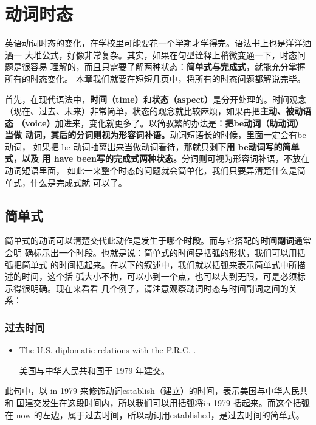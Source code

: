 \chapter{动词时态}

英语动词时态的变化，在学校里可能要花一个学期才学得完。语法书上也是洋洋洒洒一
大堆公式，好像非常复杂。其实，如果在句型诠释上稍微变通一下，时态问题是很容易
理解的，而且只需要了解两种状态：\textbf{简单式与完成式}，就能充分掌握所有的时态变化。
本章我们就要在短短几页中，将所有的时态问题都解说完毕。

首先，在现代语法中，\textbf{时间（time）}和\textbf{状态（aspect）}是分开处理的。时间观念
（现在、过去、未来）非常简单，状态的观念就比较麻烦，如果再把\textbf{主动、被动语态
  （voice）}加进来，变化就更多了。以简驭繁的办法是：\textbf{把be动词（助动词）当做
  动词，其后的分词则视为形容词补语。}动词短语长的时候，里面一定会有be 动词，
如果把 be 动词抽离出来当做动词看待，那就只剩下\textbf{用 be动词写的简单式，以及
  用 have been写的完成式两种状态。}分词则可视为形容词补语，不放在动词短语里面，
如此一来整个时态的问题就会简单化，我们只要弄清楚什么是简单式，什么是完成式就
可以了。

\section{简单式}

简单式的动词可以清楚交代此动作是发生于哪个\textbf{时段}。而与它搭配的\textbf{时间副词}通常会明
确标示出一个时段。也就是说：简单式的时间是括弧的形状，我们可以用括弧把简单式
的时间括起来。在以下的叙述中，我们就以括弧来表示简单式中所描述的时间，这个括
弧大小不拘，可以小到一个点，也可以大到无限，可是必须标示得很明确。现在来看看
几个例子，请注意观察动词时态与时间副词之间的关系：

\subsection{过去时间}

\begin{itemize}
\item The U.S.  diplomatic relations with the P.R.C. .

  美国与中华人民共和国于 1979 年建交。
\end{itemize}

此句中，以 in 1979 来修饰动词establish（建立）的时间，表示美国与中华人民共和
国建交发生在这段时间内，所以我们可以用括弧将in 1979 括起来。而这个括弧在 now
的左边，属于过去时间，所以动词用established，是过去时间的简单式。


